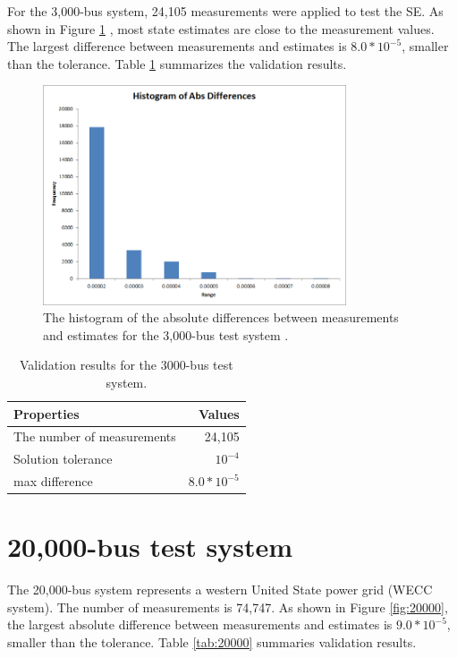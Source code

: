 \documentclass[a4paper]{article}
\begin{document}
For the 3,000-bus system, 24,105 measurements were applied to test the SE. As
shown in Figure \ref{fig:3000} , most state estimates are close to the
measurement values. The largest difference between measurements and estimates
is $8.0*10^{-5}$, smaller than the tolerance.  Table \ref{tab:3000} summarizes
the validation results.

\begin{figure}[h]
\centering
\includegraphics[width=0.8\textwidth]{3000.png}
\caption{\label{fig:hist3K}The histogram of the absolute differences between
measurements and estimates for the 3,000-bus test system .}
\label{fig:3000}
\end{figure}

\begin{table} [h]
\centering
\begin{tabular}{l|r}
Properties & Values \\\hline
The number of measurements & 24,105\\
Solution tolerance	& $10^{-4}$ \\
max difference	&  $8.0*10^{-5}$ 
\end{tabular}
\caption{\label{tab:3000} Validation results for the 3000-bus test system.}
\end{table}


\newpage
\section{20,000-bus test system}
\label{sec:20000}

The 20,000-bus system represents a western United State power grid
(WECC system). The number of measurements is 74,747. As shown in
Figure \ref{fig:20000}, the largest absolute difference between measurements
and estimates is $9.0*10^{-5}$, smaller than the tolerance. Table
\ref{tab:20000} summaries validation results.
\end{document}
